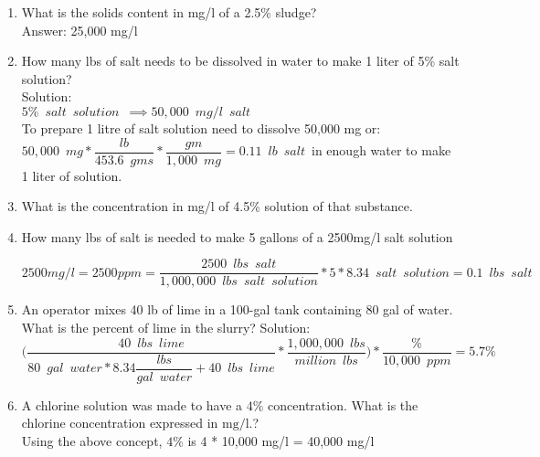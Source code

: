 \documentclass{article}
\begin{document}
\begin{enumerate}

\item What is the solids content in mg/l of a 2.5\% sludge?\\
Answer:  25,000 mg/l\\

\item How many lbs of salt needs to be dissolved in water to make 1 liter of 5\% salt solution?\\
Solution:\\
$5\% \enspace salt \enspace solution \enspace \implies 50,000 \enspace mg/l \enspace salt$\\
To prepare 1 litre of salt solution need to dissolve 50,000 mg or:\\
$50,000 \enspace mg*\dfrac{lb}{453.6 \enspace gms}*\dfrac{gm}{1,000 \enspace mg}=\boxed{0.11 \enspace lb \enspace salt}\enspace$in enough  water to make 1 liter of solution.\\

\item What is the concentration in mg/l of  4.5\% solution of that substance.

\item How many lbs of salt is needed to make 5 gallons of a 2500mg/l salt solution

$2500mg/l = 2500ppm = \dfrac{2500 \enspace lbs \enspace salt}{1,000,000 \enspace lbs \enspace salt \enspace solution}*5*8.34 \enspace salt \enspace solution=\boxed{0.1 \enspace lbs \enspace salt }$


\item An operator mixes 40 lb of lime in a 100-gal tank containing 80 gal of water. What is the percent of lime in the slurry?
\vspace{0.2cm}
Solution:\\
\vspace{0.2cm}
$\Bigg(\dfrac{40 \enspace lbs \enspace lime}{80 \enspace gal \enspace water*8.34\dfrac{lbs}{gal \enspace water}+40\enspace lbs \enspace lime}*\dfrac{1,000,000 \enspace lbs}{million \enspace lbs}\Bigg)*\dfrac{\%}{10,000 \enspace ppm}=\boxed{5.7\%}$

\item A chlorine solution was made to have a $4 \%$ concentration. What is the chlorine concentration expressed in $\mathrm{mg} / \mathrm{l}$.?\\

Using the above concept, $4 \%$ is 4 * 10,000 mg/l = 40,000 mg/l\\


\end{enumerate}
\end{document}

